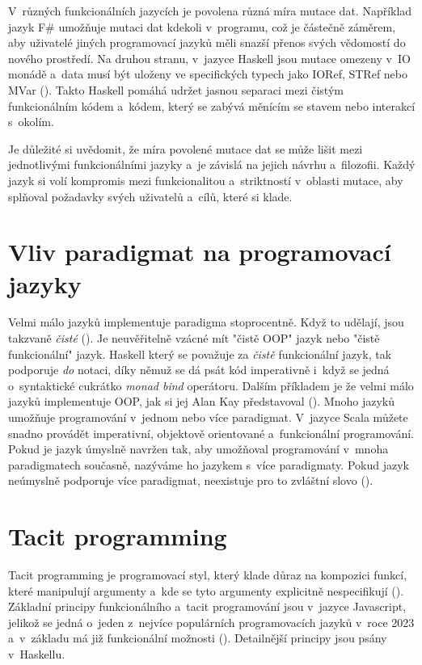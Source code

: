 \documentclass[male, czech]{kithesis}
\begin{document}
V~různých funkcionálních jazycích je povolena různá míra mutace dat.
Například jazyk F\# umožňuje mutaci dat kdekoli v~programu, 
což je částečně záměrem, 
aby uživatelé jiných programovací jazyků měli snazší přenos svých vědomostí do 
nového prostředí.
Na druhou stranu, 
v~jazyce Haskell jsou mutace omezeny v~IO monádě
a~data musí být uloženy 
ve specifických typech jako IORef, STRef nebo MVar (\cite{Jones2010}). 
Takto Haskell pomáhá udržet jasnou separaci mezi čistým funkcionálním kódem a~kódem, 
který se zabývá měnícím se stavem nebo interakcí s~okolím.

Je důležité si uvědomit, 
že míra povolené mutace dat se může lišit mezi jednotlivými funkcionálními jazyky
a~je závislá na jejich návrhu a~filozofii. 
Každý jazyk si volí kompromis mezi funkcionalitou
a~striktností v~oblasti mutace, 
aby splňoval požadavky svých uživatelů a~cílů, 
které si klade.

\section{Vliv paradigmat na programovací jazyky}
Velmi málo jazyků implementuje paradigma stoprocentně. 
Když to udělají, 
jsou takzvaně \textit{čisté} (\cite{ProgrammingParadigms}). 
Je neuvěřitelně vzácné mít "čistě OOP" jazyk nebo 
"čistě funkcionální" jazyk. 
Haskell který se považuje za \textit{čistě} funkcionální jazyk,
tak podporuje \textit{do} notaci, 
díky němuž se dá psát kód imperativně
i~když se jedná o~syntaktické cukrátko \textit{monad bind} operátoru.
Dalším příkladem je že velmi málo jazyků implementuje OOP, 
jak si jej Alan Kay představoval (\cite{ProgrammingParadigms}).
Mnoho jazyků umožňuje programování v~jednom nebo více paradigmat. 
V~jazyce Scala můžete snadno provádět imperativní, 
objektově orientované a~funkcionální programování. 
Pokud je jazyk úmyslně navržen tak, 
aby umožňoval programování v~mnoha paradigmatech současně, 
nazýváme ho jazykem s~více paradigmaty. 
Pokud jazyk neúmyslně podporuje více paradigmat, 
neexistuje pro to zvláštní slovo (\cite{ProgrammingParadigms}).

\section{Tacit programming}

Tacit programming je programovací styl, 
který klade důraz na kompozici funkcí, 
které manipulují argumenty
a~kde se tyto argumenty explicitně nespecifikují (\cite{Barros2005}).
Základní principy funkcionálního a~tacit programování jsou v~jazyce Javascript,
jelikož se jedná o~jeden z~nejvíce populárních programovacích jazyků v~roce 2023
a~v~základu má již funkcionální možnosti (\cite{StackSurvey}).
Detailnější principy jsou psány v~Haskellu.
\end{document}
